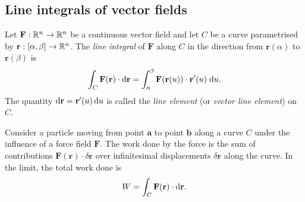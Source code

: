 \documentclass[a4paper]{article}
\begin{document}
\subsection{Line integrals of vector fields}

\begin{defi}
  Let $\mathbf{F}: \mathbb{R}^n \to \mathbb{R}^n$ be a continuous vector field and let $C$ be a curve parametrised by $\mathbf{r}: [\alpha, \beta] \to \mathbb{R}^n$. The \emph{line integral} of $\mathbf{F}$ along $C$ in the direction from $\mathbf{r}(\alpha)$ to $\mathbf{r}(\beta)$ is
  \[
    \int_C \mathbf{F}(\mathbf{r})\cdot \mathrm{d} \mathbf{r} = \int_\alpha^\beta \mathbf{F}(\mathbf{r}(u))\cdot \mathbf{r}'(u)\; \mathrm{d} u.
  \]
  The quantity $\mathrm{d} \mathbf{r} = \mathbf{r}'(u) \, \mathrm{d} u$ is called the \emph{line element} (or \emph{vector line element}) on $C$.
\end{defi}

\begin{rmk}
  Consider a particle moving from point $\mathbf{a}$ to point $\mathbf{b}$ along a curve $C$ under the influence of a force field $\mathbf{F}$. The work done by the force is the sum of contributions $\mathbf{F}(\mathbf{r}) \cdot \delta\mathbf{r}$ over infinitesimal displacements $\delta\mathbf{r}$ along the curve. In the limit, the total work done is
  \[
    W = \int_C \mathbf{F}(\mathbf{r})\cdot \mathrm{d} \mathbf{r}.
  \]
\end{rmk}
\end{document}
